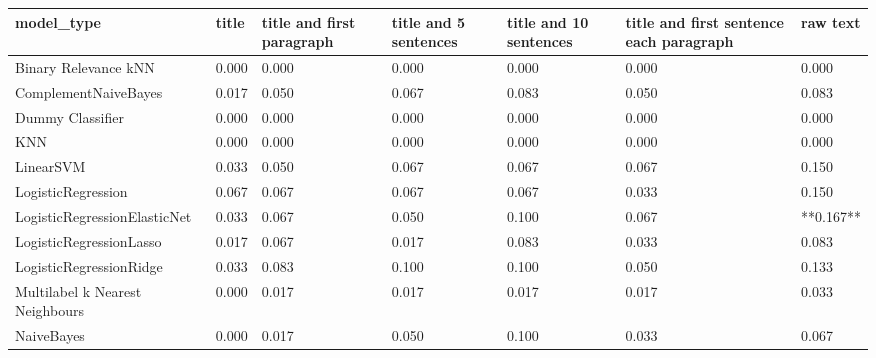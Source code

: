 \begin{tabular}{lllllll}
\toprule
                     model\_type & title & title and first paragraph & title and 5 sentences & title and 10 sentences & title and first sentence each paragraph &  raw text \\
\midrule
           Binary Relevance kNN & 0.000 &                     0.000 &                 0.000 &                  0.000 &                                   0.000 &     0.000 \\
           ComplementNaiveBayes & 0.017 &                     0.050 &                 0.067 &                  0.083 &                                   0.050 &     0.083 \\
               Dummy Classifier & 0.000 &                     0.000 &                 0.000 &                  0.000 &                                   0.000 &     0.000 \\
                            KNN & 0.000 &                     0.000 &                 0.000 &                  0.000 &                                   0.000 &     0.000 \\
                      LinearSVM & 0.033 &                     0.050 &                 0.067 &                  0.067 &                                   0.067 &     0.150 \\
             LogisticRegression & 0.067 &                     0.067 &                 0.067 &                  0.067 &                                   0.033 &     0.150 \\
   LogisticRegressionElasticNet & 0.033 &                     0.067 &                 0.050 &                  0.100 &                                   0.067 & **0.167** \\
        LogisticRegressionLasso & 0.017 &                     0.067 &                 0.017 &                  0.083 &                                   0.033 &     0.083 \\
        LogisticRegressionRidge & 0.033 &                     0.083 &                 0.100 &                  0.100 &                                   0.050 &     0.133 \\
Multilabel k Nearest Neighbours & 0.000 &                     0.017 &                 0.017 &                  0.017 &                                   0.017 &     0.033 \\
                     NaiveBayes & 0.000 &                     0.017 &                 0.050 &                  0.100 &                                   0.033 &     0.067 \\

\end{tabular}
